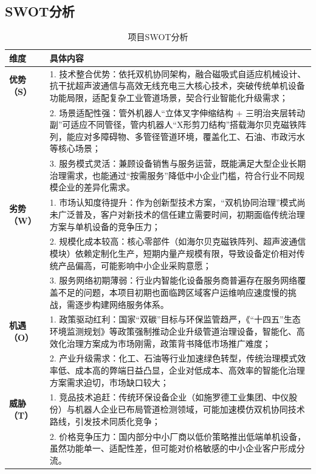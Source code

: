 \documentclass[12pt, a4paper]{article}
\begin{document}
\begin{table}[htbp]
    \subsection{SWOT分析}
\centering
\caption{项目SWOT分析}
\begin{tabular}{p{}p{}}
\toprule
\textbf{维度} & \textbf{具体内容} \\
\midrule
\textbf{优势（S）} & 
1. 技术整合优势：依托双机协同架构，融合磁吸式自适应机械设计、抗干扰超声波通信与高效无线充电三大核心技术，突破传统单机设备功能局限，适配复杂工业管道场景，契合行业智能化升级需求；\\
& 2. 场景适配性强：管外机器人“立体叉字伸缩结构 + 三明治夹层转动副”可适应不同管径，管内机器人“X形剪刀结构”搭载海尔贝克磁铁阵列，能应对多障碍物、多管径管道环境，覆盖化工、石油、市政污水等核心场景；\\
& 3. 服务模式灵活：兼顾设备销售与服务运营，既能满足大型企业长期治理需求，也能通过“按需服务”降低中小企业门槛，符合行业不同规模企业的差异化需求。 \\
\midrule
\textbf{劣势（W）} & 
1. 市场认知度待提升：作为创新型技术方案，“双机协同治理”模式尚未广泛普及，客户对新技术的信任建立需要时间，初期面临传统治理方案与单机设备的竞争压力；\\
& 2. 规模化成本较高：核心零部件（如海尔贝克磁铁阵列、超声波通信模块）依赖定制化生产，短期内量产规模有限，导致设备定价相对传统产品偏高，可能影响中小企业采购意愿；\\
& 3. 服务网络初期薄弱：行业内智能化设备服务商普遍存在服务网络覆盖不足的问题，本项目初期也面临跨区域客户运维响应速度慢的挑战，需逐步构建网络服务体系。 \\
\midrule
\textbf{机遇（O）} & 
1. 政策驱动红利：国家“双碳”目标与环保监管趋严，《“十四五”生态环境监测规划》等政策强制推动企业升级管道治理设备，智能化、高效化治理方案成为市场刚需，政策背书降低市场推广难度；\\
& 2. 产业升级需求：化工、石油等行业加速绿色转型，传统治理模式效率低、成本高的弊端日益凸显，企业对低成本、高效率的智能化治理方案需求迫切，市场缺口较大；\\

\midrule
\textbf{威胁（T）} & 
1. 竞品技术追赶：传统环保设备企业（如施罗德工业集团、中仪股份）与机器人企业已布局管道检测领域，可能加速模仿双机协同技术路线，引发技术同质化竞争；\\
& 2. 价格竞争压力：国内部分中小厂商以低价策略推出低端单机设备，虽然功能单一、适配性差，但可能对价格敏感的中小企业客户形成分流。 \\
\bottomrule
\end{tabular}
\end{table}
\end{document}
